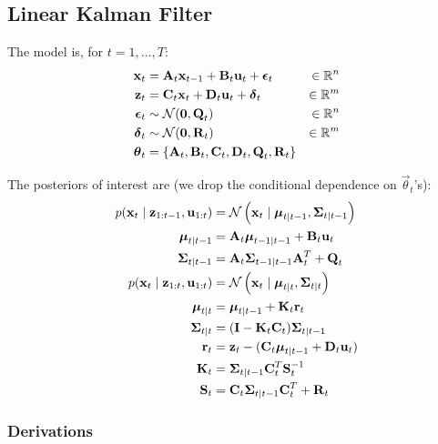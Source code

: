 \subsection{Linear Kalman Filter}
The model is, for $t = 1, \dotsc, T$:
\begin{align}
	\vec x_t 		&= \vec A_t \vec x_{t - 1} + \vec B_t \vec u_t + \vec\epsilon_t 	&\in \mathbb R^n\\
	\vec z_t		&= \vec C_t \vec x_t + \vec D_t \vec u_t + \vec\delta_t 			&\in \mathbb R^m\\
	\vec\epsilon_t	&\sim \Gauss(\vec 0, \vec Q_t) 										&\in \mathbb R^n\\
	\vec\delta_t	&\sim \Gauss(\vec 0, \vec R_t) 										&\in \mathbb R^m\\
	\vec\theta_t 	&= \{\vec A_t, \vec B_t, \vec C_t, \vec D_t, \vec Q_t, \vec R_t\}
\end{align}

The posteriors of interest are (we drop the conditional dependence on $\vec \theta_t$'s):
\begin{align}
	p(\vec x_t \mid \vec z_{1:t - 1}, \vec u_{1:t})	&= \Gauss\left(\vec x_t \mid \vec \mu_{t \mid t - 1}, \vec\Sigma_{t \mid t - 1}\right) \\
	\vec \mu_{t \mid t - 1}							&= \vec A_t \vec\mu_{t - 1 \mid t - 1} + \vec B_t \vec u_t \\
	\vec \Sigma_{t \mid t - 1}						&= \vec A_t \vec\Sigma_{t - 1 \mid t - 1} \vec A_t^T + \vec Q_t \\
	p(\vec x_t \mid \vec z_{1:t}, \vec u_{1:t}) 	&= \Gauss\left(\vec x_t \mid \vec \mu_{t \mid t}, \vec\Sigma_{t \mid t}\right) \\
	\vec \mu_{t \mid t}								&= \vec\mu_{t \mid t - 1} + \vec K_t \vec r_t \\
	\vec \Sigma_{t \mid t}							&= (\vec I - \vec K_t \vec C_t) \vec\Sigma_{t \mid t - 1} \\
	\vec r_t 										&= \vec z_t - (\vec C_t \vec \mu_{t \mid t - 1} + \vec D_t \vec u_t) \\
	\vec K_t										&= \vec\Sigma_{t \mid t - 1} \vec C_t^T \vec S_t^{-1} \\
	\vec S_t										&= \vec C_t \vec\Sigma_{t \mid t - 1}\vec C_t^T + \vec R_t
\end{align}

\subsubsection{Derivations}